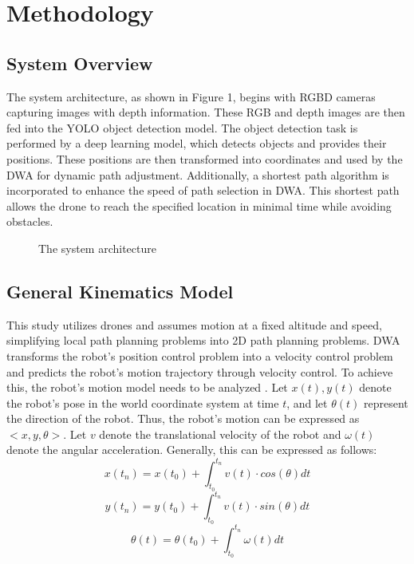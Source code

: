 \documentclass[crop=false]{standalone}
\begin{document}
	\section{Methodology}
	\subsection{System Overview}
	The system architecture, as shown in Figure 1, begins with RGBD cameras capturing images with depth information. These RGB and depth images are then fed into the YOLO object detection model. The object detection task is performed by a deep learning model, which detects objects and provides their positions. These positions are then transformed into coordinates and used by the DWA for dynamic path adjustment. Additionally, a shortest path algorithm is incorporated to enhance the speed of path selection in DWA. This shortest path allows the drone to reach the specified location in minimal time while avoiding obstacles.
	
	\begin{figure*}[thbp!]
		\centering
		\caption{The system architecture}
		\label{fig:system}
	\end{figure*}
	
	\subsection{General Kinematics Model}
	This study utilizes drones and assumes motion at a fixed altitude and speed, simplifying local path planning problems into 2D path planning problems. DWA transforms the robot's position control problem into a velocity control problem and predicts the robot's motion trajectory through velocity control. To achieve this, the robot's motion model needs to be analyzed \cite{fox}. Let $x(t), y(t)$ denote the robot's pose in the world coordinate system at time $t$, and let $\theta(t)$ represent the direction of the robot. Thus, the robot's motion can be expressed as $<x, y, \theta>$. Let $v$ denote the translational velocity of the robot and $\omega(t)$ denote the angular acceleration. Generally, this can be expressed as follows:
	\begin{equation}
		x(t_n)=x(t_0)+ \int_{t_0}^{t_n}v(t) \cdot cos(\theta)dt
	\end{equation}
	\begin{equation}
		y(t_n)=y(t_0)+ \int_{t_0}^{t_n}v(t) \cdot sin(\theta)dt
	\end{equation}
	\begin{equation}
		\theta(t)=\theta(t_0)+\int_{t_0}^{t_n}\omega(t)dt
	\end{equation}
\end{document}
